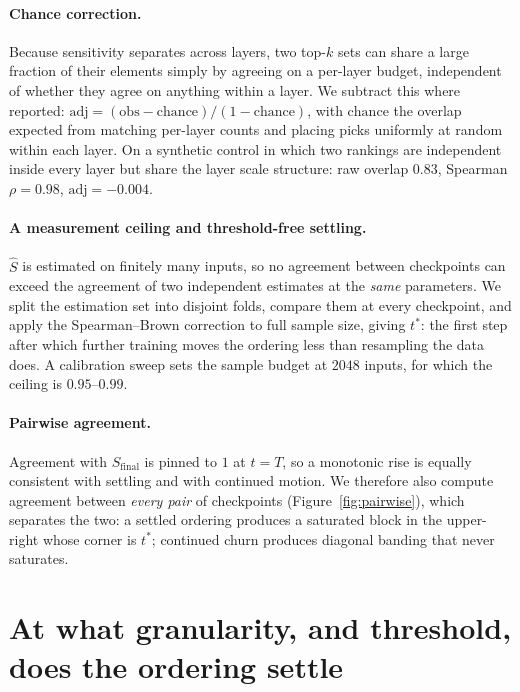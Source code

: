 \documentclass{article}
\begin{document}
\paragraph{Chance correction.}
Because sensitivity separates across layers, two top-$k$ sets can share a large fraction of
their elements simply by agreeing on a per-layer budget, independent of whether they agree
on anything within a layer. We subtract this where reported: $\mathrm{adj}=(\mathrm{obs}-
\mathrm{chance})/(1-\mathrm{chance})$, with $\mathrm{chance}$ the overlap expected from
matching per-layer counts and placing picks uniformly at random within each layer. On a
synthetic control in which two rankings are independent inside every layer but share the
layer scale structure: raw overlap $0.83$, Spearman $\rho=0.98$, $\mathrm{adj}=-0.004$.

\paragraph{A measurement ceiling and threshold-free settling.}
$\widehat S$ is estimated on finitely many inputs, so no agreement between checkpoints can
exceed the agreement of two independent estimates at the \emph{same} parameters. We split
the estimation set into disjoint folds, compare them at every checkpoint, and apply the
Spearman--Brown correction to full sample size, giving $t^*$: the first step after which
further training moves the ordering less than resampling the data does. A calibration
sweep sets the sample budget at $2048$ inputs, for which the ceiling is $0.95$--$0.99$.

\paragraph{Pairwise agreement.}
Agreement with $S_{\mathrm{final}}$ is pinned to $1$ at $t=T$, so a monotonic rise is
equally consistent with settling and with continued motion. We therefore also compute
agreement between \emph{every pair} of checkpoints (Figure~\ref{fig:pairwise}), which
separates the two: a settled ordering produces a saturated block in the upper-right whose
corner is $t^*$; continued churn produces diagonal banding that never saturates.

\section{At what granularity, and threshold, does the ordering settle}
\label{sec:results}
\end{document}
